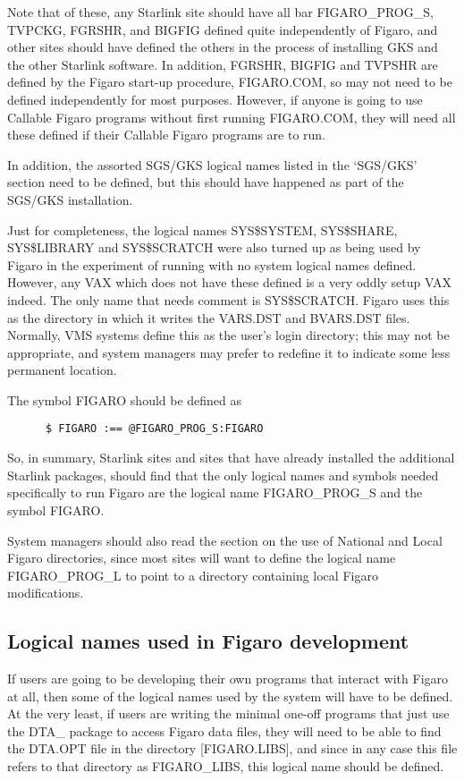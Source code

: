 Note that of these, any Starlink site should have all bar FIGARO\_PROG\_S,
TVPCKG, FGRSHR, and BIGFIG defined quite independently of Figaro, and other
sites should have defined the others in  the process of installing GKS and the
other Starlink software. In addition, FGRSHR, BIGFIG and TVPSHR are defined by
the Figaro start-up procedure, FIGARO.COM, so may not need to be defined
independently for most purposes. However, if anyone is going to use Callable
Figaro programs without first running FIGARO.COM, they will need all these
defined if their Callable Figaro programs are to run.

In addition, the assorted SGS/GKS logical names listed in the `SGS/GKS' section
need to be defined, but this should have happened as part of the SGS/GKS
installation.

Just for completeness, the logical names SYS\$SYSTEM, SYS\$SHARE, SYS\$LIBRARY 
and SYS\$SCRATCH were also turned up as being used by Figaro in the experiment
of running with no system logical names defined. However, any  VAX which does
not have these defined is a very oddly setup VAX indeed. The only name that
needs comment is SYS\$SCRATCH. Figaro uses this as the directory in which it
writes the VARS.DST and BVARS.DST files. Normally, VMS systems define this as
the user's login directory; this may not be appropriate, and system managers
may prefer to redefine it to indicate some  less permanent location.

The symbol FIGARO should be defined as

\begin{verbatim} 
      $ FIGARO :== @FIGARO_PROG_S:FIGARO
\end{verbatim}

So, in summary, Starlink sites and sites that have already installed the 
additional Starlink packages, should find that the only logical names and
symbols needed specifically to run Figaro are the logical name FIGARO\_PROG\_S
and the symbol FIGARO.

System managers should also read the section on the use of National and Local
Figaro directories, since most sites will want to define the logical  name
FIGARO\_PROG\_L to point to a directory containing local Figaro modifications. 

\subsection{Logical names used in Figaro development} 

If users are going to be developing their own programs that interact with
Figaro at all, then some of the logical names used by the system will have to
be defined. At the very least, if users are writing the minimal one-off
programs that just use the DTA\_ package to access Figaro data files, they will
need to be able to find the DTA.OPT file in the directory [FIGARO.LIBS], and
since in any case this file refers to that directory as FIGARO\_LIBS, this
logical name should be defined.

